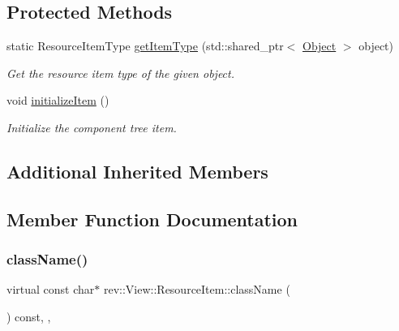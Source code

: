 \subsection*{Protected Methods}
\begin{DoxyCompactItemize}
\item 
\mbox{\label{classrev_1_1_view_1_1_resource_item_addcf2986b6d0c432af165c616a1c5141}} 
static Resource\+Item\+Type \mbox{\hyperlink{classrev_1_1_view_1_1_resource_item_addcf2986b6d0c432af165c616a1c5141}{get\+Item\+Type}} (std\+::shared\+\_\+ptr$<$ \mbox{\hyperlink{classrev_1_1_object}{Object}} $>$ object)
\begin{DoxyCompactList}\small\item\em Get the resource item type of the given object. \end{DoxyCompactList}\item 
\mbox{\label{classrev_1_1_view_1_1_resource_item_a3fabbf0594db7faad55b686b564fd026}} 
void \mbox{\hyperlink{classrev_1_1_view_1_1_resource_item_a3fabbf0594db7faad55b686b564fd026}{initialize\+Item}} ()
\begin{DoxyCompactList}\small\item\em Initialize the component tree item. \end{DoxyCompactList}\end{DoxyCompactItemize}
\subsection*{Additional Inherited Members}


\subsection{Member Function Documentation}
\mbox{\label{classrev_1_1_view_1_1_resource_item_ab53eb0848ac7e530ad5dc8220bf8609a}} 
\subsubsection{\texorpdfstring{className()}{className()}}
{\footnotesize\ttfamily virtual const char$\ast$ rev\+::\+View\+::\+Resource\+Item\+::class\+Name (\begin{DoxyParamCaption}{ }\end{DoxyParamCaption}) const\hspace{0.3cm}{\ttfamily [inline]}, {\ttfamily [override]}, {\ttfamily [virtual]}}



